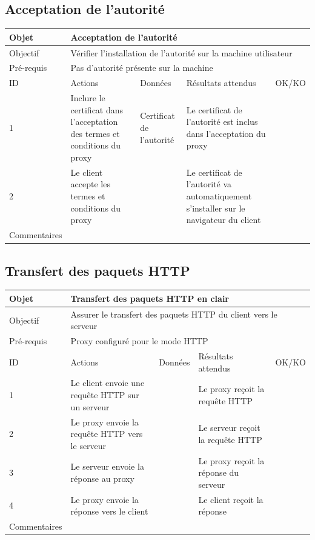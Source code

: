 \documentclass[a4paper,11pt,french]{article}
\begin{document}
\newpage

\subsection{Acceptation de l'autorité}

\begin{tabular}{|m{2.5cm}|m{4cm}|m{3cm}|m{3.5cm}|m{2cm}|}
\hline 
\rowcolor{Blue} Objet & \multicolumn{4}{|l|}{Acceptation de l'autorité} \\ 
\hline 
\rowcolor{Blue} Objectif & \multicolumn{4}{|l|}{Vérifier l'installation de l'autorité sur la machine utilisateur} \\ 
\hline 
\rowcolor{Blue} Pré-requis & \multicolumn{4}{|l|}{Pas d'autorité présente sur la machine} \\ 
\hline 
\rowcolor{Orange} ID & Actions & Données & Résultats attendus & OK/KO \\ 
\hline 
1 & Inclure le certificat dans l'acceptation des termes et conditions du proxy & Certificat de l'autorité & Le certificat de l'autorité est inclus dans l'acceptation du proxy &  \\ 
\hline
2 & Le client accepte les termes et conditions du proxy & & Le certificat de 
l'autorité va automatiquement s'installer sur le navigateur du client & 
\\
\hline 
Commentaires & \multicolumn{4}{|l|}{} \\ 
\hline
\end{tabular}

\newpage

\subsection{Transfert des paquets HTTP}

\begin{tabular}{|m{2.5cm}|m{4cm}|m{3cm}|m{3.5cm}|m{2cm}|}
\hline 
\rowcolor{Blue} Objet & \multicolumn{4}{|l|}{Transfert des paquets HTTP en clair} \\ 
\hline 
\rowcolor{Blue} Objectif & \multicolumn{4}{|l|}{Assurer le transfert des paquets HTTP du client vers le serveur} \\ 
\hline 
\rowcolor{Blue} Pré-requis & \multicolumn{4}{|l|}{Proxy configuré pour le mode HTTP} \\ 
\hline 
\rowcolor{Orange} ID & Actions & Données & Résultats attendus & OK/KO \\ 
\hline 
1 & Le client envoie une requête HTTP sur un serveur &  & Le proxy reçoit la requête HTTP &  \\ 
\hline
2 & Le proxy envoie la requête HTTP vers le serveur & & Le serveur reçoit la requête HTTP & \\
\hline
3 & Le serveur envoie la réponse au proxy & & Le proxy 
reçoit la réponse du serveur & \\
\hline 
4 & Le proxy envoie la réponse vers le client & & Le client reçoit la réponse & 
\\
\hline
Commentaires & \multicolumn{4}{|l|}{} \\ 
\hline
\end{tabular}
\end{document}
